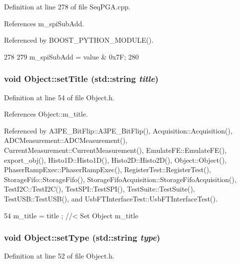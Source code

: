 Definition at line 278 of file SeqPGA.cpp.

References m\_\-spiSubAdd.

Referenced by BOOST\_\-PYTHON\_\-MODULE().


\begin{DoxyCode}
278                                                         {
279   m_spiSubAdd = value & 0x7F;
280 }
\end{DoxyCode}
\hypertarget{classObject_a89557dbbad5bcaa02652f5d7fa35d20f}{
\subsubsection[{setTitle}]{\setlength{\rightskip}{0pt plus 5cm}void Object::setTitle (std::string {\em title})}}
\label{classObject_a89557dbbad5bcaa02652f5d7fa35d20f}


Definition at line 54 of file Object.h.

References Object::m\_\-title.

Referenced by A3PE\_\-BitFlip::A3PE\_\-BitFlip(), Acquisition::Acquisition(), ADCMeasurement::ADCMeasurement(), CurrentMeasurement::CurrentMeasurement(), EmulateFE::EmulateFE(), export\_\-obj(), Histo1D::Histo1D(), Histo2D::Histo2D(), Object::Object(), PhaserRampExec::PhaserRampExec(), RegisterTest::RegisterTest(), StorageFifo::StorageFifo(), StorageFifoAcquisition::StorageFifoAcquisition(), TestI2C::TestI2C(), TestSPI::TestSPI(), TestSuite::TestSuite(), TestUSB::TestUSB(), and UsbFTInterfaceTest::UsbFTInterfaceTest().


\begin{DoxyCode}
54 { m_title = title ; } //< Set Object m_title
\end{DoxyCode}
\hypertarget{classObject_aae534cc9d982bcb9b99fd505f2e103a5}{
\subsubsection[{setType}]{\setlength{\rightskip}{0pt plus 5cm}void Object::setType (std::string {\em type})}}
\label{classObject_aae534cc9d982bcb9b99fd505f2e103a5}


Definition at line 52 of file Object.h.


